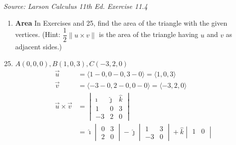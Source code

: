 \textit{Source: Larson Calculus 11th Ed. Exercise 11.4}

\begin{enumerate}[label={}, leftmargin=*]
    \item \textbf{Area} In Exercises and 25, find the area of the triangle with the given
          vertices. (Hint: $\dfrac{1}{2}\|u \times v\|$ is the area of the triangle
          having $u$ and $v$ as adjacent sides.)
\end{enumerate}
\begin{enumerate}
    \setcounter{enumi}{24}
    \item $A(0,0,0), B(1,0,3), C(-3,2,0)$
          \sol{}
          \begin{align*}
              \vec{u}                & = \langle 1 - 0, 0 - 0, 3 - 0 \rangle = \langle 1, 0, 3 \rangle                    \\
              \vec{v}                & = \langle -3 - 0, 2 - 0, 0 - 0 \rangle = \langle -3, 2, 0 \rangle                  \\
              \vec{u} \times \vec{v} & = \begin{vmatrix}
                                             \hat{\imath} & \hat{\jmath} & \hat{k} \\
                                             1            & 0            & 3       \\
                                             -3           & 2            & 0
                                         \end{vmatrix}                        \\
                                     & = \hat{\imath} \begin{vmatrix}
                                                          0 & 3 \\
                                                          2 & 0
                                                      \end{vmatrix} - \hat{\jmath} \begin{vmatrix}
                                                                                       1  & 3 \\
                                                                                       -3 & 0
                                                                                   \end{vmatrix} + \hat{k} \begin{vmatrix}
                                                                                                               1  & 0 \\

\end{vmatrix}
\end{align*}
\end{enumerate}
